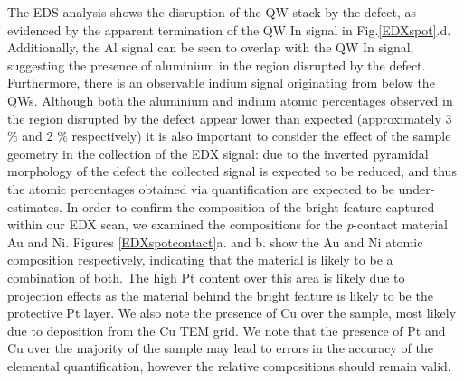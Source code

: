 The EDS analysis shows the disruption of the QW stack by the defect, as evidenced by the apparent termination of the QW In signal in Fig.\ref{EDXspot}.d. Additionally, the Al signal can be seen to overlap with the QW In signal, suggesting the presence of aluminium in the region disrupted by the defect. Furthermore, there is an observable indium signal originating from below the QWs. Although both the aluminium and indium atomic percentages observed in the region disrupted by the defect appear lower than expected (approximately 3 $\%$ and 2 $\%$ respectively) it is also important to consider the effect of the sample geometry in the collection of the EDX signal: due to the inverted pyramidal morphology of the defect the collected signal is expected to be reduced, and thus the atomic percentages obtained via quantification are expected to be under-estimates. In order to confirm  the composition of the bright feature captured within our EDX scan, we examined the compositions for the \textit{p}-contact material Au and Ni. Figures \ref{EDXspotcontact}a. and b. show the Au and Ni atomic composition respectively, indicating that the material is likely to be a combination of both. The high Pt content over this area is likely due to projection effects as the material behind the bright feature is likely to be the protective Pt layer. We also note the presence of Cu over the sample, most likely due to deposition from the Cu TEM grid. We note that the presence of Pt and Cu over the majority of the sample may lead to errors in the accuracy of the elemental quantification, however the relative compositions should remain valid.

